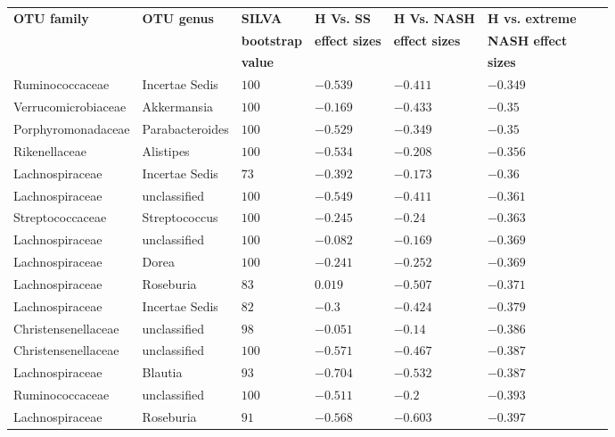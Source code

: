 \begin{table}[!ht]
\begin{tiny}
\begin{tabular}{|l|l|l|l|l|l|l|l|}
\hline
\bf{OTU family} & \bf{OTU genus} & \bf{SILVA} &\bf{H Vs. SS} & \bf{H Vs. NASH} & \bf{H vs. extreme} \\
& & \bf{bootstrap} & \bf{effect sizes} & \bf{effect sizes} & \bf{NASH effect} \\
& & \bf{value} & & & \bf{sizes}\\ \hline
Ruminococcaceae & Incertae Sedis & $100$ & $-0.539$ & $-0.411$ & $-0.349$ \\ \hline
Verrucomicrobiaceae & Akkermansia & $100$ & $-0.169$ & $-0.433$ & $-0.35$ \\ \hline
Porphyromonadaceae & Parabacteroides & $100$ & $-0.529$ & $-0.349$ & $-0.35$ \\ \hline
Rikenellaceae & Alistipes & $100$ & $-0.534$ & $-0.208$ & $-0.356$ \\ \hline
Lachnospiraceae & Incertae Sedis & $73$ & $-0.392$ & $-0.173$ & $-0.36$ \\ \hline
Lachnospiraceae & unclassified & $100$ & $-0.549$ & $-0.411$ & $-0.361$ \\ \hline
Streptococcaceae & Streptococcus & $100$ & $-0.245$ & $-0.24$ & $-0.363$ \\ \hline
Lachnospiraceae & unclassified & $100$ & $-0.082$ & $-0.169$ & $-0.369$ \\ \hline
Lachnospiraceae & Dorea & $100$ & $-0.241$ & $-0.252$ & $-0.369$ \\ \hline
Lachnospiraceae & Roseburia & $83$ & $0.019$ & $-0.507$ & $-0.371$ \\ \hline
Lachnospiraceae & Incertae Sedis & $82$ & $-0.3$ & $-0.424$ & $-0.379$ \\ \hline
Christensenellaceae & unclassified & $98$ & $-0.051$ & $-0.14$ & $-0.386$ \\ \hline
Christensenellaceae & unclassified & $100$ & $-0.571$ & $-0.467$ & $-0.387$ \\ \hline
Lachnospiraceae & Blautia & $93$ & $-0.704$ & $-0.532$ & $-0.387$ \\ \hline
Ruminococcaceae & unclassified & $100$ & $-0.511$ & $-0.2$ & $-0.393$ \\ \hline
Lachnospiraceae & Roseburia & $91$ & $-0.568$ & $-0.603$ & $-0.397$ \\ \hline

\end{tabular}
\end{tiny}
\end{table}
